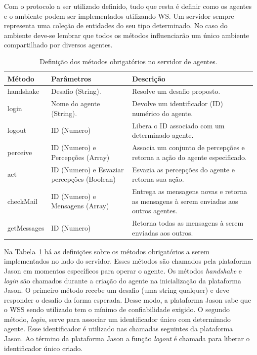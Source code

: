 Com o protocolo a ser utilizado definido, tudo que resta é definir como os
agentes e o ambiente podem ser implementados utilizando WS. Um servidor sempre
representa uma coleção de entidades do seu tipo determinado. No caso do
ambiente deve-se lembrar que todos os métodos influenciarão um único ambiente
compartilhado por diversos agentes.

\begin{table}
	\caption{Definição dos métodos obrigatórios no servidor de agentes.}
	\label{table-server-agents}
	\begin{center}
	\begin{tabular}{|p{34mm}|p{50mm}|p{50mm}|} %
		\hline
		Método & Parâmetros & Descrição \\ \hline
		handshake & Desafio (String). & Resolve um desafio proposto. \\ \hline
		login & Nome do agente (String). & Devolve um identificador (ID) numérico do agente. \\ \hline
		logout & ID (Numero) & Libera o ID associado com um determinado agente. \\ \hline
		perceive & ID (Numero) e Percepções (Array) & Associa um conjunto de percepções e retorna a ação do agente especificado.\\ \hline
		act & ID (Numero) e Esvaziar percepções (Boolean) & Esvazia as percepções do agente e retorna sua ação. \\ \hline
		checkMail & ID (Numero) e Mensagens (Array) & Entrega as mensagens
novas e retorna as mensagens à serem enviadas aos outros agentes.\\ \hline
		getMessages & ID (Numero) & Retorna todas as mensagens à serem enviadas aos outros. \\ \hline
	\end{tabular}
	\end{center}
\end{table}

Na Tabela~\ref{table-server-agents} há as definições sobre os métodos
obrigatórios a serem implementados no lado do servidor. Esses métodos são
chamados pela plataforma Jason em momentos específicos para operar o agente.
Os métodos \emph{handshake} e \emph{login} são chamados durante a criação do
agente na inicialização da plataforma Jason. O primeiro método recebe um
desafio (uma string qualquer) e deve responder o desafio da forma esperada.
Desse modo, a plataforma Jason sabe que o WSS sendo utilizado tem o mínimo de
confiabilidade exigido. O segundo método, \emph{login}, serve para associar um
identificador único com determinado agente. Esse identificador é utilizado nas
chamadas seguintes da plataforma Jason. Ao término da plataforma Jason a
função \emph{logout} é chamada para liberar o identificador único
criado.%

